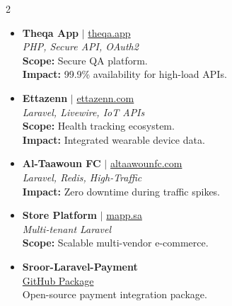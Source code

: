 \documentclass[10pt, a4paper]{article}
\begin{document}
\begin{paracol}{2}
\begin{itemize}[leftmargin=0.15in, label={}]
    \item \textbf{Theqa App} $|$ \href{https://theqa.app/}{theqa.app} \\
    \footnotesize \textit{PHP, Secure API, OAuth2} \\
    \textbf{Scope:} Secure QA platform. \\
    \textbf{Impact:} 99.9\% availability for high-load APIs.
    \vspace{6pt}

    \item \textbf{Ettazenn} $|$ \href{https://ettazenn.com/}{ettazenn.com} \\
    \footnotesize \textit{Laravel, Livewire, IoT APIs} \\
    \textbf{Scope:} Health tracking ecosystem. \\
    \textbf{Impact:} Integrated wearable device data.
    \vspace{6pt}

    \item \textbf{Al-Taawoun FC} $|$ \href{https://altaawounfc.com/}{altaawounfc.com} \\
    \footnotesize \textit{Laravel, Redis, High-Traffic} \\
    \textbf{Impact:} Zero downtime during traffic spikes.
    \vspace{6pt}

    \item \textbf{Store Platform} $|$ \href{https://mapp.sa/}{mapp.sa} \\
    \footnotesize \textit{Multi-tenant Laravel} \\
    \textbf{Scope:} Scalable multi-vendor e-commerce.
    \vspace{4pt}
    
    \item \textbf{Sroor-Laravel-Payment} \\
    \footnotesize \href{https://github.com/Kamalsroor/sroor-laravel-payment}{GitHub Package} \\
    Open-source payment integration package.
\end{itemize}


\end{paracol}
\end{document}
